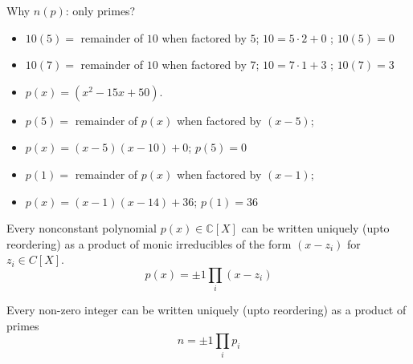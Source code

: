 \documentclass[8pt]{beamer}
\newcommand{\C}{\mathbb C}
\begin{document}
\begin{frame}{Why $n(p)$: only primes?}
\begin{itemize}
\item $10(5) = $ remainder of $10$ when factored by $5$; $10 = 5\cdot 2 + 0$ ; $10(5) = 0$
\item $10(7) = $ remainder of $10$ when factored by $7$; $10 = 7\cdot1 + 3$  ; $10(7) = 3$
\end{itemize}
\begin{itemize}
\item $p(x) = (x^2 - 15x + 50)$. \pause
\item $p(5) = $ \pause remainder of $p(x)$ when factored by $(x - 5)$; \pause 
\item $p(x) = (x-5)(x-10) + 0$; \pause $p(5) = 0$ \pause
\item $p(1) = $ \pause remainder of $p(x)$ when factored by $(x - 1)$; \pause 
\item $p(x) = (x-1)(x - 14) + 36$; \pause $p(1) = 36$ \pause
\end{itemize}

\pause

\begin{theorem} 
Every nonconstant polynomial $p(x) \in \C[X]$ can be written uniquely (upto reordering) as
a product of monic irreducibles of the form $(x - z_i)$ for $z_i \in C[X]$.
$$p(x) = \pm 1 \prod_i (x - z_i)$$
\end{theorem}

\pause

\begin{theorem} 
Every non-zero integer can be written uniquely (upto reordering) as a product of primes
$$n = \pm 1 \prod_i p_i$$
\end{theorem}

\end{frame}
\end{document}
